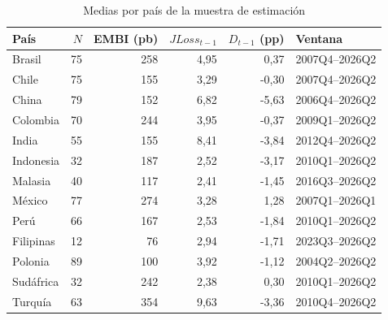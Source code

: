 \begin{table}[htbp]
\centering
\small
\caption{Medias por país de la muestra de estimación}
\label{tab:mediaspais}
\begin{tabular}{lrrrrl}
\toprule
País & $N$ & EMBI (pb) & $JLoss_{t-1}$ & $D_{t-1}$ (pp) & Ventana \\
\midrule
Brasil & 75 & 258 & 4{,}95 & 0{,}37 & 2007Q4--2026Q2 \\
Chile & 75 & 155 & 3{,}29 & -0{,}30 & 2007Q4--2026Q2 \\
China & 79 & 152 & 6{,}82 & -5{,}63 & 2006Q4--2026Q2 \\
Colombia & 70 & 244 & 3{,}95 & -0{,}37 & 2009Q1--2026Q2 \\
India & 55 & 155 & 8{,}41 & -3{,}84 & 2012Q4--2026Q2 \\
Indonesia & 32 & 187 & 2{,}52 & -3{,}17 & 2010Q1--2026Q2 \\
Malasia & 40 & 117 & 2{,}41 & -1{,}45 & 2016Q3--2026Q2 \\
México & 77 & 274 & 3{,}28 & 1{,}28 & 2007Q1--2026Q1 \\
Perú & 66 & 167 & 2{,}53 & -1{,}84 & 2010Q1--2026Q2 \\
Filipinas & 12 & 76 & 2{,}94 & -1{,}71 & 2023Q3--2026Q2 \\
Polonia & 89 & 100 & 3{,}92 & -1{,}12 & 2004Q2--2026Q2 \\
Sudáfrica & 32 & 242 & 2{,}38 & 0{,}30 & 2010Q1--2026Q2 \\
Turquía & 63 & 354 & 9{,}63 & -3{,}36 & 2010Q4--2026Q2 \\
\bottomrule
\end{tabular}
\end{table}

